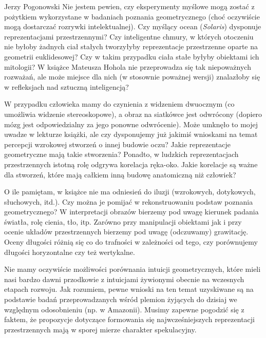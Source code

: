 \begin{newrevengenv}{Jerzy Pogonowski}
Nie jestem pewien, czy eksperymenty myślowe mogą zostać z
pożytkiem wykorzystane w badaniach poznania geometrycznego (choć
oczywiście mogą dostarczać rozrywki intelektualnej). Czy myślący
ocean ({\em Solaris}) dysponuje reprezentacjami przestrzennymi?
Czy inteligentne chmury, w których otoczeniu nie byłoby żadnych
ciał stałych tworzyłyby reprezentacje przestrzenne oparte na
geometrii euklidesowej? Czy w takim przypadku ciała stałe byłyby
obiektami ich mitologii? W książce Mateusza Hohola nie
przeprowadza się tak niepoważnych rozważań, ale może miejsce dla
nich (w stosownie poważnej wersji) znalazłoby się w refleksjach
nad sztuczną inteligencją?

W przypadku człowieka mamy do czynienia z widzeniem dwuocznym (co
umożliwia widzenie stereoskopowe), a obraz na siatkówce jest
odwrócony (dopiero mózg jest odpowiedzialny za jego ponowne
odwrócenie). Może umknęło to mojej uwadze w lekturze książki, ale
czy dysponujemy już jakimiś wnioskami na temat percepcji wzrokowej
stworzeń o innej budowie oczu? Jakie reprezentacje geometryczne
mają takie stworzenia? Ponadto, w ludzkich reprezentacjach
przestrzennych istotną rolę odgrywa korelacja ręka-oko. Jakie
korelacje są ważne dla stworzeń, które mają całkiem inną budowę
anatomiczną niż człowiek?

O ile pamiętam, w książce nie ma odniesień do iluzji (wzrokowych,
dotykowych, słuchowych, itd.). Czy można je pomijać w
rekonstruowaniu podstaw poznania geometrycznego? W interpretacji
obrazów bierzemy pod uwagę kierunek padania światła, rolę cienia,
tło, itp. Zarówno przy manipulacji obiektami jak i przy ocenie
układów przestrzennych bierzemy pod uwagę (odczuwamy) grawitację.
Oceny długości różnią się co do trafności w zależności od tego,
czy porównujemy długości horyzontalne czy też wertykalne.

Nie mamy oczywiście możliwości porównania intuicji geometrycznych,
które mieli nasi bardzo dawni przodkowie z intuicjami żywionymi
obecnie na wczesnych etapach rozwoju. Jak rozumiem, pewne wnioski
na ten temat uzyskiwane są na podstawie badań przeprowadzanych
wśród plemion żyjących do dzisiaj we względnym odosobnieniu (np. w
Amazonii). Musimy zapewne pogodzić się z faktem, że propozycje
dotyczące formowania się najwcześniejszych reprezentacji
przestrzennych mają w sporej mierze charakter spekulacyjny.


\end{newrevengenv}

